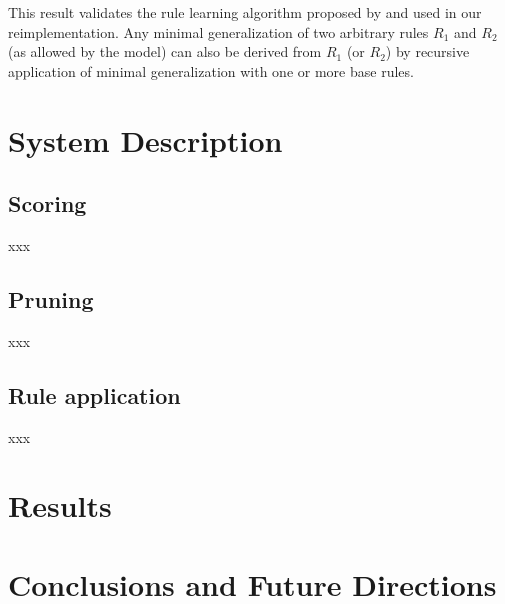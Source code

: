\documentclass[11pt]{article}
\begin{document}
This result validates the rule learning algorithm proposed by \citet{albright2002a} and used in our reimplementation. Any minimal generalization of two arbitrary rules $R_1$ and $R_2$ (as allowed by the model) can also be derived from $R_1$ (or $R_2$) by recursive application of minimal generalization with one or more base rules.


\section{System Description}

\subsection{Scoring}

xxx

\subsection{Pruning}

xxx

\subsection{Rule application}

\citep{gorman-2016-pynini, gorman2021}
xxx

\citep{hayes2008a}

\section{Results}





\section{Conclusions and Future Directions}
\end{document}
